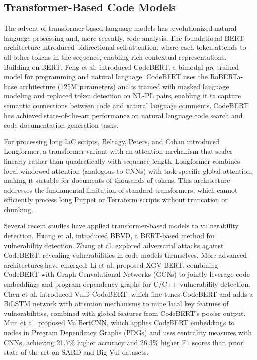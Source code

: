 \subsection{Transformer-Based Code Models}

The advent of transformer-based language models has revolutionized natural language processing and, more recently, code analysis. The foundational BERT architecture \cite{Devlin19} introduced bidirectional self-attention, where each token attends to all other tokens in the sequence, enabling rich contextual representations. Building on BERT, Feng et al. \cite{Feng20} introduced CodeBERT, a bimodal pre-trained model for programming and natural language. CodeBERT uses the RoBERTa-base architecture (125M parameters) and is trained with masked language modeling and replaced token detection on NL-PL pairs, enabling it to capture semantic connections between code and natural language comments. CodeBERT has achieved state-of-the-art performance on natural language code search and code documentation generation tasks.

For processing long IaC scripts, Beltagy, Peters, and Cohan \cite{Beltagy20} introduced Longformer, a transformer variant with an attention mechanism that scales linearly rather than quadratically with sequence length. Longformer combines local windowed attention (analogous to CNNs) with task-specific global attention, making it suitable for documents of thousands of tokens. This architecture addresses the fundamental limitation of standard transformers, which cannot efficiently process long Puppet or Terraform scripts without truncation or chunking.

Several recent studies have applied transformer-based models to vulnerability detection. Huang et al. \cite{Huang22} introduced BBVD, a BERT-based method for vulnerability detection. Zhang et al. \cite{Zhang24} explored adversarial attacks against CodeBERT, revealing vulnerabilities in code models themselves. More advanced architectures have emerged: Li et al. \cite{Li23} proposed XGV-BERT, combining CodeBERT with Graph Convolutional Networks (GCNs) to jointly leverage code embeddings and program dependency graphs for C/C++ vulnerability detection. Chen et al. \cite{Chen24} introduced VulD-CodeBERT, which fine-tunes CodeBERT and adds a BiLSTM network with attention mechanisms to mine local key features of vulnerabilities, combined with global features from CodeBERT's pooler output. Mim et al. \cite{Mim24} proposed VulBertCNN, which applies CodeBERT embeddings to nodes in Program Dependency Graphs (PDGs) and uses centrality measures with CNNs, achieving 21.7\% higher accuracy and 26.3\% higher F1 scores than prior state-of-the-art on SARD and Big-Vul datasets.


